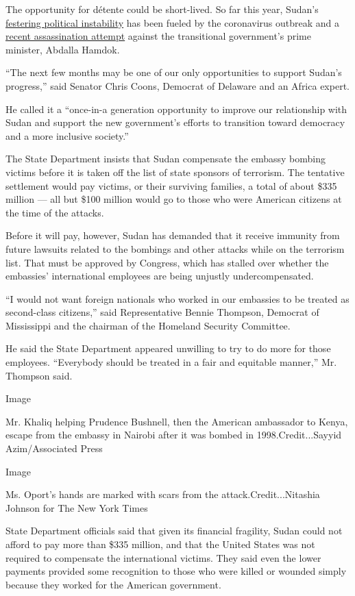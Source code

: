 The opportunity for détente could be short-lived. So far this year,
Sudan's
\href{https://www.aljazeera.com/news/2020/06/sudan-protesters-return-streets-demand-reforms-200630154320885.html}{festering
political instability} has been fueled by the coronavirus outbreak and a
\href{https://www.bbc.com/news/world-africa-51800278}{recent
assassination attempt} against the transitional government's prime
minister, Abdalla Hamdok.

``The next few months may be one of our only opportunities to support
Sudan's progress,'' said Senator Chris Coons, Democrat of Delaware and
an Africa expert.

He called it a ``once-in-a generation opportunity to improve our
relationship with Sudan and support the new government's efforts to
transition toward democracy and a more inclusive society.''

The State Department insists that Sudan compensate the embassy bombing
victims before it is taken off the list of state sponsors of terrorism.
The tentative settlement would pay victims, or their surviving families,
a total of about \$335 million --- all but \$100 million would go to
those who were American citizens at the time of the attacks.

Before it will pay, however, Sudan has demanded that it receive immunity
from future lawsuits related to the bombings and other attacks while on
the terrorism list. That must be approved by Congress, which has stalled
over whether the embassies' international employees are being unjustly
undercompensated.

``I would not want foreign nationals who worked in our embassies to be
treated as second-class citizens,'' said Representative Bennie Thompson,
Democrat of Mississippi and the chairman of the Homeland Security
Committee.

He said the State Department appeared unwilling to try to do more for
those employees. ``Everybody should be treated in a fair and equitable
manner,'' Mr. Thompson said.

Image

Mr. Khaliq helping Prudence Bushnell, then the American ambassador to
Kenya, escape from the embassy in Nairobi after it was bombed in
1998.Credit...Sayyid Azim/Associated Press

Image

Ms. Oport's hands are marked with scars from the
attack.Credit...Nitashia Johnson for The New York Times

State Department officials said that given its financial fragility,
Sudan could not afford to pay more than \$335 million, and that the
United States was not required to compensate the international victims.
They said even the lower payments provided some recognition to those who
were killed or wounded simply because they worked for the American
government.

